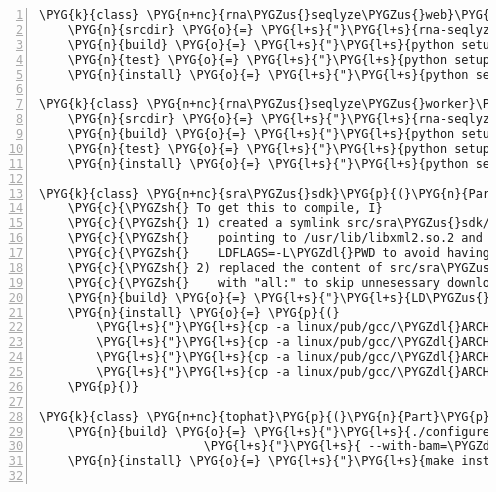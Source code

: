 \begin{Verbatim}[commandchars=\\\{\},numbers=left,firstnumber=1,stepnumber=5]
\PYG{k}{class} \PYG{n+nc}{rna\PYGZus{}seqlyze\PYGZus{}web}\PYG{p}{(}\PYG{n}{Part}\PYG{p}{)}\PYG{p}{:}
    \PYG{n}{srcdir} \PYG{o}{=} \PYG{l+s}{"}\PYG{l+s}{rna-seqlyze-web}\PYG{l+s}{"}
    \PYG{n}{build} \PYG{o}{=} \PYG{l+s}{"}\PYG{l+s}{python setup.py build}\PYG{l+s}{"}
    \PYG{n}{test} \PYG{o}{=} \PYG{l+s}{"}\PYG{l+s}{python setup.py test}\PYG{l+s}{"}
    \PYG{n}{install} \PYG{o}{=} \PYG{l+s}{"}\PYG{l+s}{python setup.py develop --prefix=\PYGZdl{}PREFIX}\PYG{l+s}{"}

\PYG{k}{class} \PYG{n+nc}{rna\PYGZus{}seqlyze\PYGZus{}worker}\PYG{p}{(}\PYG{n}{Part}\PYG{p}{)}\PYG{p}{:}
    \PYG{n}{srcdir} \PYG{o}{=} \PYG{l+s}{"}\PYG{l+s}{rna-seqlyze-worker}\PYG{l+s}{"}
    \PYG{n}{build} \PYG{o}{=} \PYG{l+s}{"}\PYG{l+s}{python setup.py build}\PYG{l+s}{"}
    \PYG{n}{test} \PYG{o}{=} \PYG{l+s}{"}\PYG{l+s}{python setup.py test}\PYG{l+s}{"}
    \PYG{n}{install} \PYG{o}{=} \PYG{l+s}{"}\PYG{l+s}{python setup.py develop --prefix=\PYGZdl{}PREFIX}\PYG{l+s}{"}

\PYG{k}{class} \PYG{n+nc}{sra\PYGZus{}sdk}\PYG{p}{(}\PYG{n}{Part}\PYG{p}{)}\PYG{p}{:}
    \PYG{c}{\PYGZsh{} To get this to compile, I}
    \PYG{c}{\PYGZsh{} 1) created a symlink src/sra\PYGZus{}sdk/libxml2.so}
    \PYG{c}{\PYGZsh{}    pointing to /usr/lib/libxml2.so.2 and added}
    \PYG{c}{\PYGZsh{}    LDFLAGS=-L\PYGZdl{}PWD to avoid having to install libxml2-dev}
    \PYG{c}{\PYGZsh{} 2) replaced the content of src/sra\PYGZus{}sdk/libs/ext/Makefile}
    \PYG{c}{\PYGZsh{}    with "all:" to skip unnesessary downloading of zlib and libbz2}
    \PYG{n}{build} \PYG{o}{=} \PYG{l+s}{"}\PYG{l+s}{LD\PYGZus{}RUN\PYGZus{}PATH=\PYGZdl{}LIBDIR make STATIC= STATICSYSLIBS= LDFLAGS=-L\PYGZdl{}PWD}\PYG{l+s}{"}
    \PYG{n}{install} \PYG{o}{=} \PYG{p}{(}
        \PYG{l+s}{"}\PYG{l+s}{cp -a linux/pub/gcc/\PYGZdl{}ARCH/bin/* \PYGZdl{}BINDIR}\PYG{l+s}{"}\PYG{p}{,}
        \PYG{l+s}{"}\PYG{l+s}{cp -a linux/pub/gcc/\PYGZdl{}ARCH/lib/* \PYGZdl{}LIBDIR}\PYG{l+s}{"}\PYG{p}{,}
        \PYG{l+s}{"}\PYG{l+s}{cp -a linux/pub/gcc/\PYGZdl{}ARCH/mod \PYGZdl{}LIBDIR/ncbi}\PYG{l+s}{"}\PYG{p}{,}
        \PYG{l+s}{"}\PYG{l+s}{cp -a linux/pub/gcc/\PYGZdl{}ARCH/wmod \PYGZdl{}LIBDIR/ncbi}\PYG{l+s}{"}\PYG{p}{,}
    \PYG{p}{)}

\PYG{k}{class} \PYG{n+nc}{tophat}\PYG{p}{(}\PYG{n}{Part}\PYG{p}{)}\PYG{p}{:}
    \PYG{n}{build} \PYG{o}{=} \PYG{l+s}{"}\PYG{l+s}{./configure --prefix=\PYGZdl{}PREFIX}\PYG{l+s}{"} \PYGZbs{}
                       \PYG{l+s}{"}\PYG{l+s}{ --with-bam=\PYGZdl{}TOPDIR/src/samtools \&\& make}\PYG{l+s}{"}
    \PYG{n}{install} \PYG{o}{=} \PYG{l+s}{"}\PYG{l+s}{make install}\PYG{l+s}{"}


\end{Verbatim}
